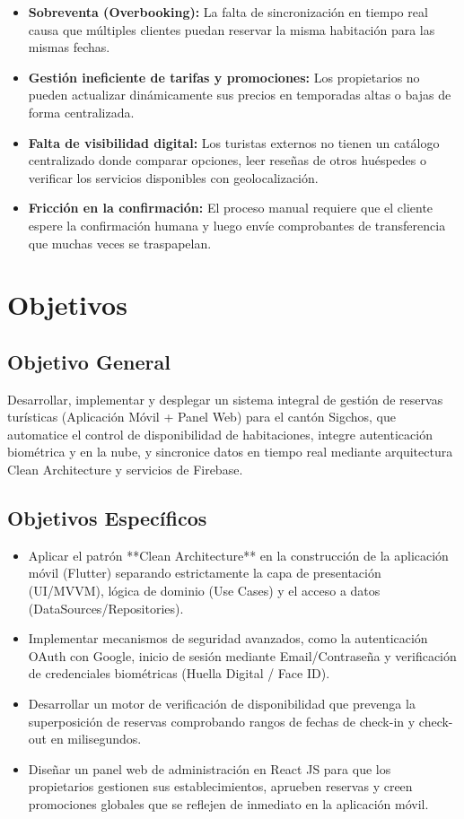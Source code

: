 \documentclass{article}
\begin{document}
\begin{itemize}[label=\small\color{verdeO}$\blacksquare$]
    \item \textbf{Sobreventa (Overbooking):} La falta de sincronización en tiempo real causa que múltiples clientes puedan reservar la misma habitación para las mismas fechas.
    \item \textbf{Gestión ineficiente de tarifas y promociones:} Los propietarios no pueden actualizar dinámicamente sus precios en temporadas altas o bajas de forma centralizada.
    \item \textbf{Falta de visibilidad digital:} Los turistas externos no tienen un catálogo centralizado donde comparar opciones, leer reseñas de otros huéspedes o verificar los servicios disponibles con geolocalización.
    \item \textbf{Fricción en la confirmación:} El proceso manual requiere que el cliente espere la confirmación humana y luego envíe comprobantes de transferencia que muchas veces se traspapelan.
\end{itemize}

\section{Objetivos}

\subsection{Objetivo General}
Desarrollar, implementar y desplegar un sistema integral de gestión de reservas turísticas (Aplicación Móvil + Panel Web) para el cantón Sigchos, que automatice el control de disponibilidad de habitaciones, integre autenticación biométrica y en la nube, y sincronice datos en tiempo real mediante arquitectura Clean Architecture y servicios de Firebase.

\subsection{Objetivos Específicos}
\begin{itemize}[label=\small\color{verdeO}$\blacksquare$]
    \item Aplicar el patrón **Clean Architecture** en la construcción de la aplicación móvil (Flutter) separando estrictamente la capa de presentación (UI/MVVM), lógica de dominio (Use Cases) y el acceso a datos (DataSources/Repositories).
    \item Implementar mecanismos de seguridad avanzados, como la autenticación OAuth con Google, inicio de sesión mediante Email/Contraseña y verificación de credenciales biométricas (Huella Digital / Face ID).
    \item Desarrollar un motor de verificación de disponibilidad que prevenga la superposición de reservas comprobando rangos de fechas de check-in y check-out en milisegundos.
    \item Diseñar un panel web de administración en React JS para que los propietarios gestionen sus establecimientos, aprueben reservas y creen promociones globales que se reflejen de inmediato en la aplicación móvil.
\end{itemize}
\end{document}

